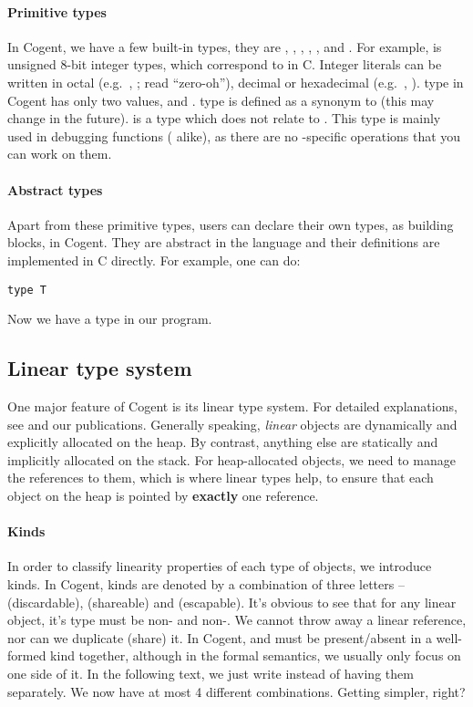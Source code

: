 \documentclass[a4paper]{article}
\newcommand{\cogent}{Cogent\xspace}
\begin{document}
\paragraph{Primitive types} In \cogent, we have a few built-in types, they are , , , ,
,  and . For example,  is unsigned 8-bit integer types, which correspond to
 in C. Integer literals can be written in octal (e.g.\ , ; read ``zero-oh''), decimal or hexadecimal
(e.g.\ , ).  type in \cogent has only two values,  and .
 type is defined as a synonym to  (this may change in the future).  is a type which
does not relate to . This type is mainly used in debugging functions ( alike), as there are
no -specific operations that you can work on them.

\paragraph{Abstract types} Apart from these primitive types, users can declare their own types, as building blocks, in \cogent.
They are abstract in the language and their definitions are implemented in C directly. For example, one can do:
\begin{lstlisting}[language=Cogent]
type T
\end{lstlisting}
Now we have a type  in our program.

\subsection{Linear type system}
One major feature of \cogent is its linear type system. For detailed explanations, see \cite{Wadler_90} and our publications.
Generally speaking, \emph{linear} objects are dynamically and explicitly allocated on the heap. By contrast, anything else are
statically and implicitly allocated on the stack. For heap-allocated objects, we need to manage the references to them, which is
where linear types help, to ensure that each object on the heap is pointed by \textbf{exactly} one reference.

\paragraph{Kinds} In order to classify linearity properties of each type of objects, we introduce kinds.
In \cogent, kinds are denoted by a combination of three letters --  (discardable),  (shareable) and  (escapable).
It's obvious to see that for any linear object, it's type must be non- and non-. We cannot throw away
a linear reference, nor can we duplicate (share) it. In \cogent,  and  must be present/absent in a well-formed kind together,
although in the formal semantics, we usually only focus on one side of it. In the following text, we just write  instead of
having them separately. We now have at most 4 different combinations. Getting simpler, right?
\end{document}
